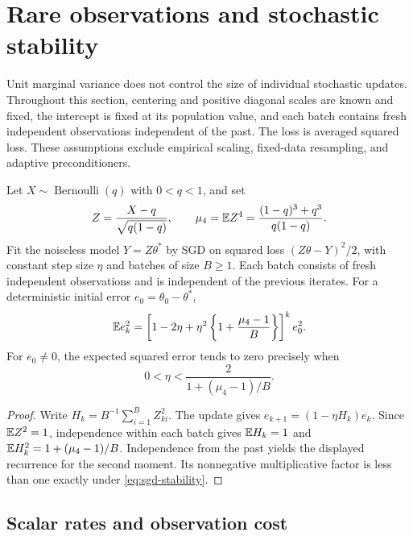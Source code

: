 \section{Rare observations and stochastic stability}
\label{sec:sgd}

Unit marginal variance does not control the size of individual stochastic
updates. Throughout this section, centering and positive diagonal scales are
known and fixed, the intercept is fixed at its population value, and each batch
contains fresh independent observations independent of the past. The loss is
averaged squared loss. These assumptions exclude empirical scaling, fixed-data
resampling, and adaptive preconditioners.

\begin{proposition}
 \label{prop:sgd-stability}
 Let $X \sim \operatorname{Bernoulli}(q)$ with $0 < q < 1$, and set
 \[
  Z = \frac{X - q}{\sqrt{q(1 - q)}},\qquad \mu_4
    = \mathbb{E} Z^4
    = \frac{(1 - q)^3 + q^3}{q(1 - q)}.
 \]
 Fit the noiseless model $Y = Z\theta^*$ by SGD on squared loss
 $(Z\theta - Y)^2/2$, with constant step size $\eta$ and batches of size
 $B \ge 1$. Each batch consists of fresh independent observations and is
 independent of the previous iterates. For a deterministic initial error
 $e_0 = \theta_0 - \theta^*$,
 \[
  \mathbb{E} e_k^2 = \left[ 1 - 2\eta + \eta^2\left\{ 1 + \frac{\mu_4 - 1}{B} \right\} \right]^k e_0^2.
 \]
 For $e_0 \ne 0$, the expected squared error tends to zero precisely when
 \begin{equation}
  \label{eq:sgd-stability}
  0 < \eta < \frac{2}{1 + (\mu_4 - 1)/B}.
 \end{equation}
\end{proposition}
\begin{proof}
 Write $H_k = B^{-1}\sum_{i=1}^B Z_{ki}^2$. The update gives
 $e_{k+1} = (1 - \eta H_k)e_k$. Since $\mathbb{E} Z^2 = 1$, independence within each
 batch gives $\mathbb{E} H_k = 1$ and $\mathbb{E} H_k^2 = 1 + (\mu_4 - 1)/B$. Independence from
 the past yields the displayed recurrence for the second moment. Its nonnegative
 multiplicative factor is less than one exactly under \eqref{eq:sgd-stability}.
\end{proof}

\subsection{Scalar rates and observation cost}

